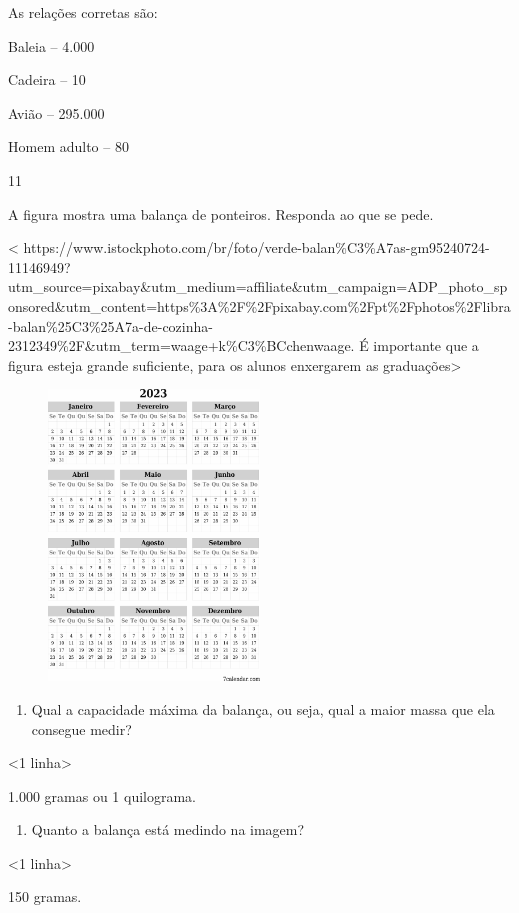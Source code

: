 {As relações corretas são:

Baleia -- 4.000

Cadeira -- 10

Avião -- 295.000

Homem adulto -- 80

\num{11}

A figura mostra uma balança de ponteiros. Responda ao que se pede.

\textless{}
https://www.istockphoto.com/br/foto/verde-balan\%C3\%A7as-gm95240724-11146949?utm\_source=pixabay\&utm\_medium=affiliate\&utm\_campaign=ADP\_photo\_sponsored\&utm\_content=https\%3A\%2F\%2Fpixabay.com\%2Fpt\%2Fphotos\%2Flibra-balan\%25C3\%25A7a-de-cozinha-2312349\%2F\&utm\_term=waage+k\%C3\%BCchenwaage.
É importante que a figura esteja grande suficiente, para os alunos
enxergarem as graduações\textgreater{}

\includegraphics[width=3.04167in,height=3.04167in]{media/image52.png}

\begin{enumerate}
\def\labelenumi{\alph{enumi})}
\item
  Qual a capacidade máxima da balança, ou seja, qual a maior massa que ela consegue medir?
\end{enumerate}

\textless{}1 linha\textgreater{}

1.000 gramas ou 1 quilograma.

\begin{enumerate}
\def\labelenumi{\alph{enumi})}
\item
  Quanto a balança está medindo na imagem?
\end{enumerate}

\textless{}1 linha\textgreater{}

150 gramas.

}
